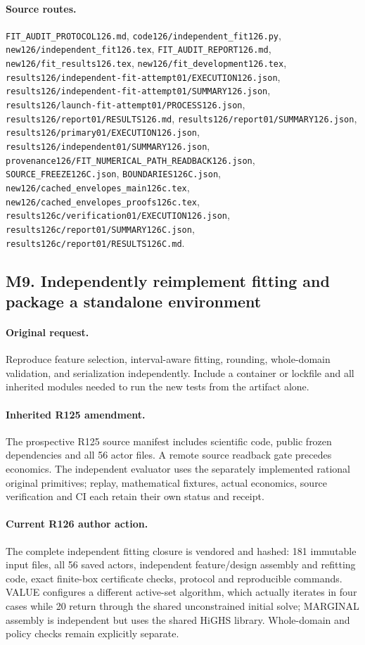 \paragraph{Source routes.} \nolinkurl{FIT_AUDIT_PROTOCOL126.md}, \nolinkurl{code126/independent_fit126.py}, \nolinkurl{new126/independent_fit126.tex}, \nolinkurl{FIT_AUDIT_REPORT126.md}, \nolinkurl{new126/fit_results126.tex}, \nolinkurl{new126/fit_development126.tex}, \nolinkurl{results126/independent-fit-attempt01/EXECUTION126.json}, \nolinkurl{results126/independent-fit-attempt01/SUMMARY126.json}, \nolinkurl{results126/launch-fit-attempt01/PROCESS126.json}, \nolinkurl{results126/report01/RESULTS126.md}, \nolinkurl{results126/report01/SUMMARY126.json}, \nolinkurl{results126/primary01/EXECUTION126.json}, \nolinkurl{results126/independent01/SUMMARY126.json}, \nolinkurl{provenance126/FIT_NUMERICAL_PATH_READBACK126.json}, \nolinkurl{SOURCE_FREEZE126C.json}, \nolinkurl{BOUNDARIES126C.json}, \nolinkurl{new126/cached_envelopes_main126c.tex}, \nolinkurl{new126/cached_envelopes_proofs126c.tex}, \nolinkurl{results126c/verification01/EXECUTION126.json}, \nolinkurl{results126c/report01/SUMMARY126C.json}, \nolinkurl{results126c/report01/RESULTS126C.md}.

\subsection*{M9. Independently reimplement fitting and package a standalone environment}
\paragraph{Original request.} Reproduce feature selection, interval-aware fitting, rounding, whole-domain validation, and serialization independently. Include a container or lockfile and all inherited modules needed to run the new tests from the artifact alone.

\paragraph{Inherited R125 amendment.} The prospective R125 source manifest includes scientific code, public frozen dependencies and all 56 actor files. A remote source readback gate precedes economics. The independent evaluator uses the separately implemented rational original primitives; replay, mathematical fixtures, actual economics, source verification and CI each retain their own status and receipt.

\paragraph{Current R126 author action.} The complete independent fitting closure is vendored and hashed: 181 immutable input files, all 56 saved actors, independent feature/design assembly and refitting code, exact finite-box certificate checks, protocol and reproducible commands. VALUE configures a different active-set algorithm, which actually iterates in four cases while 20 return through the shared unconstrained initial solve; MARGINAL assembly is independent but uses the shared HiGHS library. Whole-domain and policy checks remain explicitly separate.

